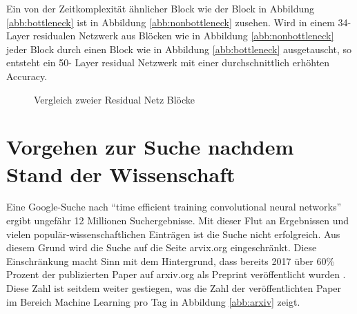 Ein von der Zeitkomplexität ähnlicher Block wie der Block in Abbildung \ref{abb:bottleneck} ist in Abbildung \ref{abb:nonbottleneck} zusehen. Wird in einem 34-Layer residualen Netzwerk aus Blöcken wie in Abbildung \ref{abb:nonbottleneck} jeder Block durch einen Block wie in Abbildung \ref{abb:bottleneck} ausgetauscht, so entsteht ein 50- Layer residual Netzwerk mit einer durchschnittlich erhöhten Accuracy. 


\begin{figure}[h]
 \centering
 \qquad
       \caption{Vergleich zweier Residual Netz Blöcke \cite{resnet}}
\end{figure}


\section{Vorgehen zur Suche nachdem Stand der Wissenschaft}
Eine Google-Suche nach ``time efficient training convolutional neural networks'' ergibt ungefähr 12 Millionen Suchergebnisse. Mit dieser Flut an Ergebnissen und vielen populär-wissenschaftlichen Einträgen ist die Suche nicht erfolgreich. Aus diesem Grund wird die Suche auf die Seite arvix.org eingeschränkt. Diese Einschränkung macht Sinn mit dem Hintergrund, dass bereits 2017 über 60\% Prozent der publizierten Paper auf arxiv.org als Preprint veröffentlicht wurden \cite{popular}. Diese Zahl ist seitdem weiter gestiegen, was die Zahl der veröffentlichten Paper im Bereich Machine Learning pro Tag in Abbildung \ref{abb:arxiv} zeigt.

